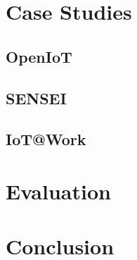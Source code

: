 \documentclass[journal]{IEEEtran}
\begin{document}
\section{Case Studies}

\blindtext

  \subsection{OpenIoT}
  \Blindtext

  \subsection{SENSEI}
  \Blindtext

  \subsection{IoT@Work}
  \Blindtext

\section{Evaluation}
\Blindtext

\section{Conclusion}
\Blindtext



\end{document}
